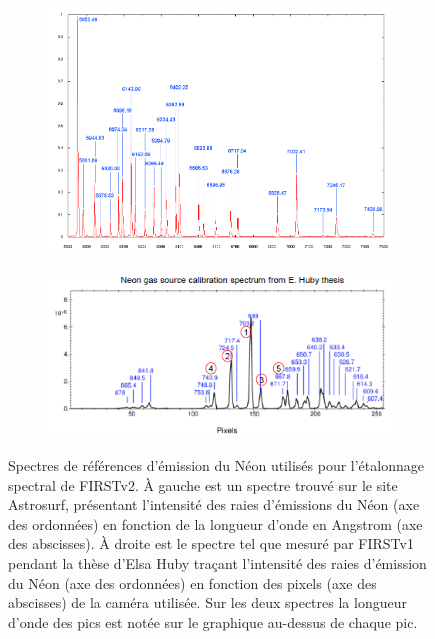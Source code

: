 \begin{figure}[ht!]
    \centering
    \begin{subfigure}{0.5\textwidth}
        \includegraphics[width=\textwidth]{Figure_Chap3/Neon_SpectrumReference_Astrosurf.png}
    \end{subfigure}%
    \begin{subfigure}{0.5\textwidth}
        \includegraphics[width=\textwidth]{Figure_Chap3/Neon_SpectrumReference_ThesisEHuby.png}
    \end{subfigure}
    \caption[Spectres de référence d'émission du Néon utilisés pour l'étalonnage spectral de \ac{FIRSTv2}.]{Spectres de références d'émission du Néon utilisés pour l'étalonnage spectral de \ac{FIRSTv2}. À gauche est un spectre trouvé sur le site Astrosurf, présentant l'intensité des raies d'émissions du Néon (axe des ordonnées) en fonction de la longueur d'onde en Angstrom (axe des abscisses). À droite est le spectre tel que mesuré par FIRSTv1 pendant la thèse d'Elsa Huby traçant l'intensité des raies d'émission du Néon (axe des ordonnées) en fonction des pixels (axe des abscisses) de la caméra utilisée. Sur les deux spectres la longueur d'onde des pics est notée sur le graphique au-dessus de chaque pic.}
    \label{fig:NeonReference}
\end{figure}

